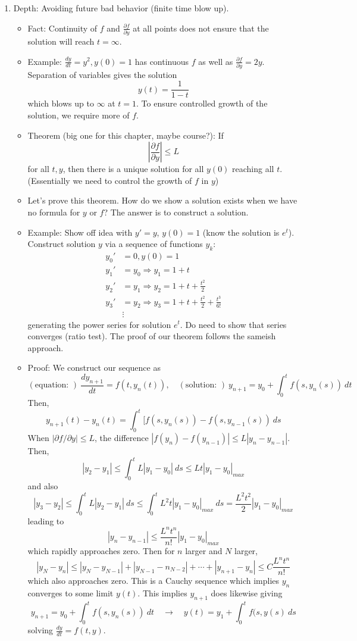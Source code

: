 \documentclass{article}
\newcommand{\ds}{\displaystyle}
\begin{document}
\begin{enumerate}
\item Depth: Avoiding future bad behavior (finite time blow up).
\begin{itemize}
\item Fact: Continuity of $f$ and $\frac{\partial f}{\partial y}$ at all points does not ensure that the solution will reach $t=\infty$.
\item Example: $\ds \frac{dy}{dt}=y^2, y(0)=1$ has continuous $f$ as well as $\frac{\partial f}{\partial y} = 2y$. Separation of variables gives the solution 
\[
y(t)= \frac{1}{1-t}
\]
which blows up to $\infty$ at $t=1$. To ensure controlled growth of the solution, we require more of $f$.
\item Theorem (big one for this chapter, maybe course?): If 
\[
\left|\frac{\partial f}{\partial y} \right| \leq L 
\]
for all $t,y$, then there is a unique solution for all $y(0)$ reaching all $t$. (Essentially we need to control the growth of $f$ in $y$)
\item Let's prove this theorem. How do we show a solution exists when we have no formula for $y$ or $f$? The answer is to construct a solution.
\item Example: Show off idea with $y'=y$, $y(0)=1$ (know the solution is $e^t$). Construct solution $y$ via a sequence of functions $y_k$:
\begin{align*}
y_0' &= 0, y(0)=1 \\
y_1' &= y_0 \Rightarrow y_1 = 1+t \\
y_2' &= y_1 \Rightarrow y_2 = 1+t+\frac{t^2}{2} \\
y_3' &= y_2 \Rightarrow y_3 = 1+t+\frac{t^2}{2}+\frac{t^3}{6!} \\
&\vdots
\end{align*}
generating the power series for solution $e^t$. 
Do need to show that series converges (ratio test).
The proof of our theorem follows the sameish approach.
\item Proof: We construct our sequence as
\[
(\text{equation: })~ \frac{dy_{n+1}}{dt} = f(t,y_n(t)), \quad 
(\text{solution: })~ y_{n+1}=y_0+\int_0^t f(s,y_n(s))~dt
\]
Then,
\[
y_{n+1}(t)-y_n(t)= \int_0^t [f(s,y_n(s))-f(s,y_{n-1}(s))~ds
\]
When $|\partial f/\partial y| \leq L$, the difference $|f(y_n)-f(y_{n-1})| \leq L|y_n-y_{n-1}|$. Then,
\[
|y_2-y_1| \leq \int_0^t L|y_1-y_0|~ds \leq Lt |y_1-y_0|_{max}
\] 
and also
\[
|y_3-y_2| \leq \int_0^t L|y_2-y_1|~ds \leq \int_0^t L^2t|y_1-y_0|_{max}~ds = \frac{L^2t^2}{2}  |y_1-y_0|_{max}
\] 
leading to 
\[
|y_n-y_{n-1}| \leq \frac{L^nt^n}{n!}  |y_1-y_0|_{max}
\]
which rapidly approaches zero. Then for $n$ larger and $N$ larger,
\[
|y_N-y_n| \leq |y_N-y_{N-1}| + |y_{N-1}-n_{N-2}| + \cdots + |y_{n+1}-y_n| \leq C \frac{L^nt^n}{n!}
\]
which also approaches zero. This is a Cauchy sequence which implies $y_n$ converges to some limit $y(t)$. This implies $y_{n+1}$ does likewise giving
\[
 y_{n+1}=y_0+\int_0^t f(s,y_n(s))~dt \quad \rightarrow \quad y(t)=y_1 + \int_0^t f(s,y(s)~ds
\]
solving $\frac{dy}{dt}=f(t,y)$.
\end{itemize}

\end{enumerate}
\end{document}
